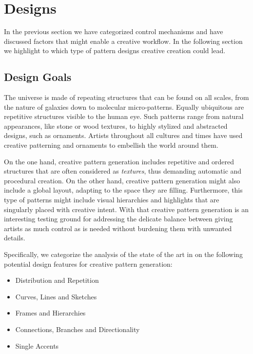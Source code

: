 
\section{Designs}
\label{sec:design}

In the previous section we have categorized control mechanisms and have discussed factors that might enable a creative workflow. In the following section we highlight to which type of pattern designs creative creation could lead.

\subsection{Design Goals}
\label{subsec:design_goals}

The universe is made of repeating structures that can be found on all scales, from the nature of galaxies down to molecular micro-patterns. Equally ubiquitous are repetitive structures visible to the human eye. Such patterns range from natural appearances, like stone or wood textures, to highly stylized and abstracted designs, such as ornaments. Artists throughout all cultures and times have used creative patterning and ornaments to embellish the world around them. 

On the one hand, creative pattern generation includes repetitive and ordered structures that are often considered as \textit{textures}, thus demanding automatic and procedural creation. On the other hand, creative pattern generation might also include a global layout, adapting to the space they are filling. Furthermore, this type of patterns might include visual hierarchies and highlights that are singularly placed with creative intent. With that creative pattern generation is an interesting testing ground for addressing the delicate balance between giving artists as much control as is needed without burdening them with unwanted details.

Specifically, we categorize the analysis of the state of the art in  on the following potential design features for creative pattern generation:


\begin{itemize}
    \item Distribution and Repetition
    \item Curves, Lines and Sketches
    \item Frames and Hierarchies
    \item Connections, Branches and Directionality
    \item Single Accents
\end{itemize}

